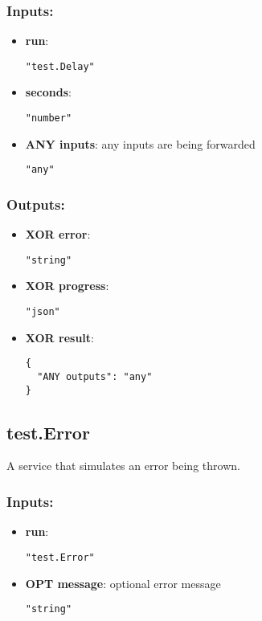 \subsubsection*{Inputs:}
\begin{itemize}
    \item \textbf{run}: 
\begin{lstlisting}
"test.Delay"
\end{lstlisting}
    \item \textbf{seconds}: 
\begin{lstlisting}
"number"
\end{lstlisting}
    \item \textbf{ANY inputs}: any inputs are being forwarded
\begin{lstlisting}
"any"
\end{lstlisting}
  \end{itemize}

\subsubsection*{Outputs:}
\begin{itemize}
    \item \textbf{XOR error}: 
\begin{lstlisting}
"string"
\end{lstlisting}
    \item \textbf{XOR progress}: 
\begin{lstlisting}
"json"
\end{lstlisting}
    \item \textbf{XOR result}: 
\begin{lstlisting}
{
  "ANY outputs": "any"
}
\end{lstlisting}
  \end{itemize}

\subsection{test.Error}
A service that simulates an error being thrown.
\subsubsection*{Inputs:}
\begin{itemize}
    \item \textbf{run}: 
\begin{lstlisting}
"test.Error"
\end{lstlisting}
    \item \textbf{OPT message}: optional error message
\begin{lstlisting}
"string"
\end{lstlisting}
  \end{itemize}


